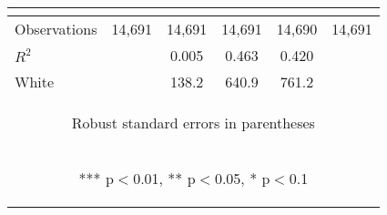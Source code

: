 \begin{center}
\begin{tabular}{lccccc}
\vspace{4pt} & \begin{footnotesize}\end{footnotesize} & \begin{footnotesize}\end{footnotesize} & \begin{footnotesize}\end{footnotesize} & \begin{footnotesize}\end{footnotesize} & \begin{footnotesize}\end{footnotesize} \\
\midrule Observations & 14,691 & 14,691 & 14,691 & 14,690 & 14,691 \\
 $R^2$ &  & 0.005 & 0.463 & 0.420 &  \\ 
 White &  & 138.2 & 640.9 & 761.2 & \\ \bottomrule
\multicolumn{6}{c}{\begin{footnotesize} Robust standard errors in parentheses\end{footnotesize}} \\
\multicolumn{6}{c}{\begin{footnotesize} *** p$<$0.01, ** p$<$0.05, * p$<$0.1\end{footnotesize}} \\
\end{tabular}
\end{center}
